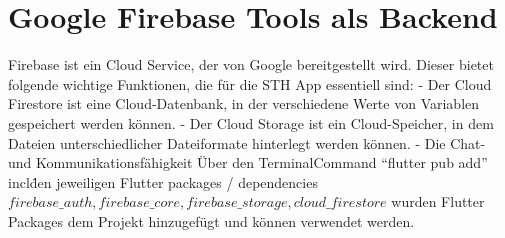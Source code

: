 \section*{Google Firebase Tools als Backend}
Firebase ist ein Cloud Service, der von Google bereitgestellt wird.
Dieser bietet folgende wichtige Funktionen, die für die STH App essentiell sind:\newline
- Der Cloud Firestore ist eine Cloud-Datenbank, in der verschiedene Werte von Variablen gespeichert werden können.\newline
- Der Cloud Storage ist ein Cloud-Speicher, in dem Dateien unterschiedlicher Dateiformate hinterlegt werden können.\newline
- Die Chat- und Kommunikationsfähigkeit\newline
Über den Terminal\-Command ``flutter pub add'' incl\. den jeweiligen Flutter packages / dependencies \(firebase\_auth, firebase\_core, firebase\_storage, cloud\_firestore\) wurden Flutter Packages dem Projekt hinzugefügt und können verwendet werden.

